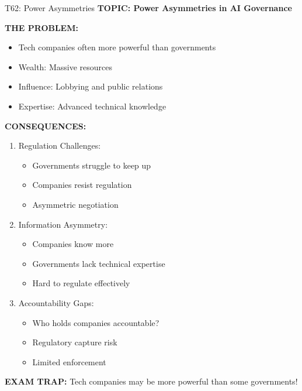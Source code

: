 \documentclass[8pt]{beamer}
\begin{document}
	\begin{frame}{T62: Power Asymmetries}
		\fontsize{6.5}{7.5}\selectfont
		\textbf{TOPIC: Power Asymmetries in AI Governance}
		
		\vspace{0.1cm}
		\textbf{THE PROBLEM:}
		\begin{itemize}
			\item Tech companies often more powerful than governments
			\item Wealth: Massive resources
			\item Influence: Lobbying and public relations
			\item Expertise: Advanced technical knowledge
		\end{itemize}
		
		\vspace{0.1cm}
		\textbf{CONSEQUENCES:}
		\begin{enumerate}
			\item \textcolor{myblue}{Regulation Challenges:}
			\begin{itemize}
				\item Governments struggle to keep up
				\item Companies resist regulation
				\item Asymmetric negotiation
			\end{itemize}
			\item \textcolor{myblue}{Information Asymmetry:}
			\begin{itemize}
				\item Companies know more
				\item Governments lack technical expertise
				\item Hard to regulate effectively
			\end{itemize}
			\item \textcolor{myblue}{Accountability Gaps:}
			\begin{itemize}
				\item Who holds companies accountable?
				\item Regulatory capture risk
				\item Limited enforcement
			\end{itemize}
		\end{enumerate}
		
		\textcolor{myred}{\textbf{EXAM TRAP:}} Tech companies may be \textcolor{myblue}{more powerful than some governments}!
	\end{frame}
	
\end{document}
